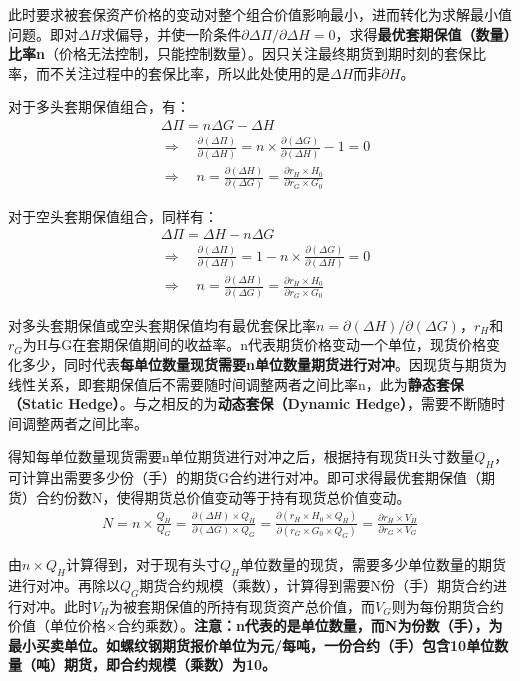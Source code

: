 \documentclass[11pt]{article}
\begin{document}
此时要求被套保资产价格的变动对整个组合价值影响最小，进而转化为求解最小值问题。即对$\Delta H$求偏导，并使一阶条件$\partial\Delta\Pi / \partial \Delta H = 0$，求得\textbf{最优套期保值（数量）比率n}（价格无法控制，只能控制数量）。因只关注最终期货到期时刻的套保比率，而不关注过程中的套保比率，所以此处使用的是$\Delta H$而非$\partial H$。

对于多头套期保值组合，有：
\begin{align*}
    &\Delta \Pi = n\Delta G - \Delta H \\
    &\Rightarrow\quad\frac{\partial (\Delta \Pi)}{\partial (\Delta H)}  = n\times \frac{\partial (\Delta G)}{\partial (\Delta H)} - 1 = 0 \\ 
    &\Rightarrow \quad n = \frac{\partial(\Delta H)}{\partial(\Delta G)} = \frac{\partial r_H \times H_0}{\partial r_G \times G_0} 
\end{align*}

对于空头套期保值组合，同样有：
\begin{align*}
    &\Delta \Pi = \Delta H - n \Delta G \\
    &\Rightarrow\quad\frac{\partial (\Delta \Pi)}{\partial (\Delta H)}  =  1 - n\times \frac{\partial (\Delta G)}{\partial (\Delta H)} = 0 \\ 
    &\Rightarrow \quad n = \frac{\partial(\Delta H)}{\partial(\Delta G)} = \frac{\partial r_H \times H_0}{\partial r_G \times G_0} 
\end{align*}

对多头套期保值或空头套期保值均有最优套保比率$n=\partial(\Delta H)/\partial(\Delta G)$，$r_H$和$r_G$为H与G在套期保值期间的收益率。n代表期货价格变动一个单位，现货价格变化多少，同时代表\textbf{每单位数量现货需要n单位数量期货进行对冲}。因现货与期货为线性关系，即套期保值后不需要随时间调整两者之间比率n，此为\textbf{静态套保（Static Hedge）}。与之相反的为\textbf{动态套保（Dynamic Hedge）}，需要不断随时间调整两者之间比率。

得知每单位数量现货需要n单位期货进行对冲之后，根据持有现货H头寸数量$Q_H$，可计算出需要多少份（手）的期货G合约进行对冲。即可求得最优套期保值（期货）合约份数N，使得期货总价值变动等于持有现货总价值变动。
\begin{align*}
    N = n \times \frac{Q_H}{Q_G} = \frac{\partial(\Delta H)\times Q_H}{\partial(\Delta G)\times Q_G} = \frac{\partial(r_H \times H_0 \times Q_H)}{\partial(r_G \times G_0 \times Q_G)} = \frac{\partial r_H \times V_H}{\partial r_G \times V_G}
\end{align*}

由$n \times Q_H$计算得到，对于现有头寸$Q_H$单位数量的现货，需要多少单位数量的期货进行对冲。再除以$Q_G$期货合约规模（乘数），计算得到需要N份（手）期货合约进行对冲。此时$V_H$为被套期保值的所持有现货资产总价值，而$V_G$则为每份期货合约价值（单位价格$\times$合约乘数）。\textbf{注意：n代表的是单位数量，而N为份数（手），为最小买卖单位。如螺纹钢期货报价单位为元/每吨，一份合约（手）包含10单位数量（吨）期货，即合约规模（乘数）为10。}
\end{document}
